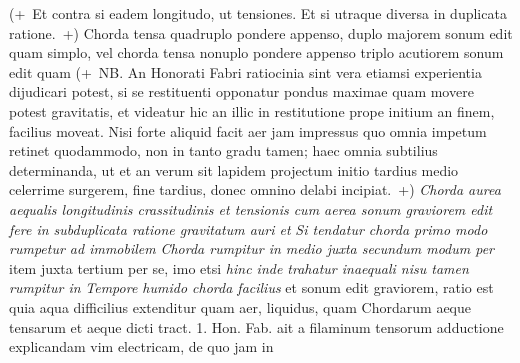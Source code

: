 (+~Et contra si eadem longitudo, ut tensiones. Et si utraque diversa in duplicata ratione.~+)  Chorda tensa quadruplo pondere appenso, duplo majorem sonum\protect{} edit quam simplo, vel chorda tensa nonuplo pondere appenso triplo acutiorem sonum edit quam 
(+~NB. An Honorati Fabri\protect{} ratiocinia sint vera etiamsi experientia dijudicari potest, si se restituenti opponatur pondus maximae quam movere potest gravitatis, et videatur hic an illic in restitutione prope initium an finem, facilius moveat. Nisi forte aliquid facit aer jam impressus quo omnia impetum retinet quodammodo, non in tanto gradu tamen; haec omnia subtilius determinanda, ut et an verum sit lapidem projectum initio tardius medio celerrime surgerem, fine tardius, donec omnino delabi incipiat.~+) 
\textit{Chorda aurea aequalis longitudinis crassitudinis et tensionis cum aerea sonum graviorem edit fere in subduplicata ratione gravitatum auri et }  
\textit{Si tendatur chorda primo modo rumpetur ad immobilem } 
\textit{Chorda rumpitur in medio juxta secundum modum per } item juxta tertium per se, imo etsi \textit{hinc inde trahatur inaequali nisu tamen rumpitur in }
\textit{Tempore humido chorda facilius } et sonum edit graviorem, ratio est quia aqua difficilius extenditur quam aer,  liquidus, quam 
\pend
\pstart 
{} Chordarum aeque tensarum et aeque 
 \hspace{-1.2mm}
\hspace{-1.2mm} dicti tract. 1. Hon. Fab. ait a filaminum tensorum adductione explicandam vim electricam, de quo jam in 
